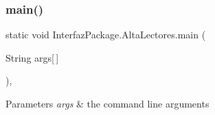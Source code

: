 \subsubsection{\texorpdfstring{main()}{main()}}
{\footnotesize\ttfamily static void Interfaz\+Package.\+Alta\+Lectores.\+main (\begin{DoxyParamCaption}\item[{String}]{args\mbox{[}$\,$\mbox{]} }\end{DoxyParamCaption})\hspace{0.3cm}{\ttfamily [inline]}, {\ttfamily [static]}}


\begin{DoxyParams}{Parameters}
{\em args} & the command line arguments \\
\hline
\end{DoxyParams}

